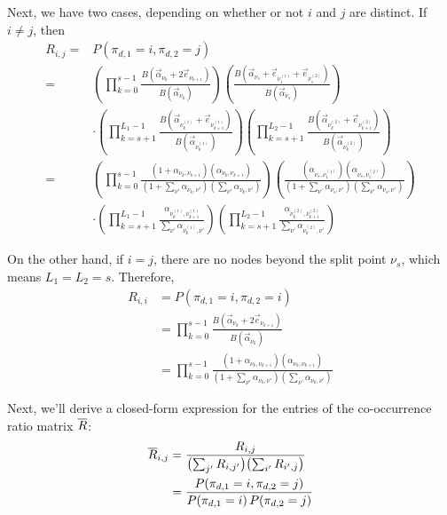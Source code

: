 \documentclass{article}
\theoremstyle{definition}
\begin{document}
Next, we have two cases, depending on whether or not $i$ and $j$ are distinct.
If $i \neq j$, then
\begin{align}
R_{i,j}
={}&P(\pi_{d,1} = i, \pi_{d,2} = j)
\nonumber
\\
={}&
\left(
  \prod_{k=0}^{s-1}
  \frac{B(\vec\alpha_{\nu_k} + 2 \vec e_{\nu_{k+1}})}
       {B(\vec\alpha_{\nu_k})}
\right)
\left(
  \frac{B(\vec\alpha_{\nu_s} + \vec e_{\nu^{(1)}_{1}} + \vec e_{\nu^{(2)}_{1}})}
       {B(\vec\alpha_{\nu_s})}
\right)
\nonumber
\\ & \cdot
\left(
  \prod_{k=s+1}^{L_1-1}
  \frac{B(\vec\alpha_{\nu^{(1)}_{k}} + \vec e_{\nu^{(1)}_{k+1}})}
       {B(\vec\alpha_{\nu^{(1)}_{k}})}
\right)
\left(
  \prod_{k=s+1}^{L_2-1}
  \frac{B(\vec\alpha_{\nu^{(2)}_{k}} + \vec e_{\nu^{(2)}_{k+1}})}
       {B(\vec\alpha_{\nu^{(2)}_{k}})}
\right)
\nonumber
\\
={}&
\left(
  \prod_{k=0}^{s-1}
  \frac{(1 + \alpha_{\nu_k,\nu_{k+1}}) (\alpha_{\nu_k,\nu_{k+1}})}
       {(1 + \sum_{\nu'} \alpha_{\nu_k,\nu'}) (\sum_{\nu'} \alpha_{\nu_k,\nu'})}
\right)
\left(
  \frac{(\alpha_{\nu_s,\nu^{(1)}_{1}}) (\alpha_{\nu_s,\nu^{(2)}_{1}})}
       {(1 + \sum_{\nu'} \alpha_{\nu_s,\nu'}) (\sum_{\nu'} \alpha_{\nu_s,\nu'})}
\right)
\nonumber
\\ & \cdot
\left(
  \prod_{k=s+1}^{L_1-1}
  \frac{\alpha_{\nu^{(1)}_{k}, \nu^{(1)}_{k+1}}}
       {\sum_{\nu'} \alpha_{\nu^{(1)}_{k}, \nu'}}
\right)
\left(
  \prod_{k=s+1}^{L_2-1}
  \frac{\alpha_{\nu^{(2)}_{k}, \nu^{(2)}_{k+1}}}
       {\sum_{\nu'} \alpha_{\nu^{(2)}_{k}, \nu'}}
\right)
\label{eqn:cooccurDistinct}
\end{align}

On the other hand, if $i = j$, there are no nodes beyond the split point $\nu_s$, which means $L_1 = L_2 = s$.
Therefore,
\begin{align}
R_{i,i}
&= P(\pi_{d,1} = i, \pi_{d,2} = i)
\nonumber
\\
&=
  \prod_{k=0}^{s-1}
  \frac{B(\vec\alpha_{\nu_k} + 2 \vec e_{\nu_{k+1}})}
       {B(\vec\alpha_{\nu_k})}
\nonumber
\\
&=
\prod_{k=0}^{s-1}
\frac{(1 + \alpha_{\nu_k,\nu_{k+1}}) (\alpha_{\nu_k,\nu_{k+1}})}
     {(1 + \sum_{\nu'} \alpha_{\nu_k,\nu'}) (\sum_{\nu'} \alpha_{\nu_k,\nu'})}
\label{eqn:cooccurSame}
\end{align}

Next, we'll derive a closed-form expression for the entries of the co-occurrence ratio matrix $\overline{R}$:
\begin{align*}
\overline{R}_{i,j}
&=
\frac{R_{i,j}}{ \bigl( \sum_{j'} R_{i,j'} \bigr) \bigl( \sum_{i'} R_{i',j} \bigr) }
\\
&=
\frac{P(\pi_{d,1} = i, \pi_{d,2} = j)}
     {P(\pi_{d,1} = i) \, P(\pi_{d,2} = j)}
\end{align*}
\end{document}

